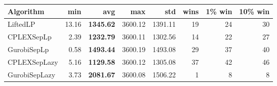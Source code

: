 \begin{tabular}{lrrrrrrr}
Algorithm & min & avg & max & std
& wins & 1\% win & 10\% win 
\\
\hline
LiftedLP&13.16& \bf1345.62& 3600.12& 1391.11&19&24&30\\
CPLEXSepLp&2.39& \bf1232.79& 3600.11& 1302.56&14&22&27\\
GurobiSepLp&0.58& \bf1493.44& 3600.19& 1493.08&29&37&40\\
CPLEXSepLazy&5.16& \bf1129.58& 3600.12& 1305.08&37&42&46\\
GurobiSepLazy&3.73& \bf2081.67& 3600.08& 1506.22&1&8&8
\end{tabular}

